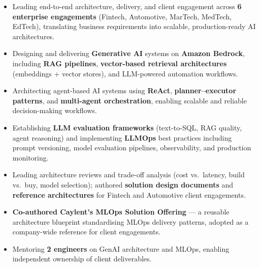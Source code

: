 \documentclass[10pt,a4paper]{article}
\begin{document}
\begin{itemize}[leftmargin=1.2em, label=\textopenbullet]
  \item Leading end-to-end architecture, delivery, and client engagement across \textbf{6 enterprise engagements} (Fintech, Automotive, MarTech, MedTech, EdTech), translating business requirements into scalable, production-ready AI architectures.
  \item Designing and delivering \textbf{Generative AI} systems on \textbf{Amazon Bedrock}, including \textbf{RAG pipelines}, \textbf{vector-based retrieval architectures} (embeddings + vector stores), and LLM-powered automation workflows.
  \item Architecting agent-based AI systems using \textbf{ReAct}, \textbf{planner--executor patterns}, and \textbf{multi-agent orchestration}, enabling scalable and reliable decision-making workflows.
  \item Establishing \textbf{LLM evaluation frameworks} (text-to-SQL, RAG quality, agent reasoning) and implementing \textbf{LLMOps} best practices including prompt versioning, model evaluation pipelines, observability, and production monitoring.
  \item Leading architecture reviews and trade-off analysis (cost vs.\ latency, build vs.\ buy, model selection); authored \textbf{solution design documents} and \textbf{reference architectures} for Fintech and Automotive client engagements.
  \item \textbf{Co-authored Caylent's MLOps Solution Offering} --- a reusable architecture blueprint standardising MLOps delivery patterns, adopted as a company-wide reference for client engagements.
  \item Mentoring \textbf{2 engineers} on GenAI architecture and MLOps, enabling independent ownership of client deliverables.
\end{itemize}
\end{document}
